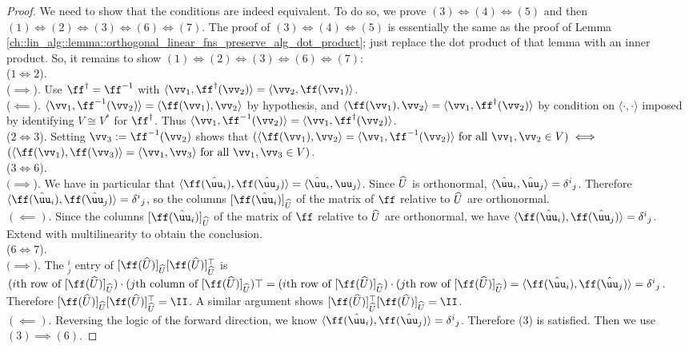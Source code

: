 \begin{proof}
    We need to show that the conditions are indeed equivalent. To do so, we prove $(3) \iff (4) \iff (5)$ and then $(1) \iff (2) \iff (3) \iff (6) \iff (7)$. The proof of $(3) \iff (4) \iff (5)$ is essentially the same as the proof of Lemma \ref{ch::lin_alg::lemma::orthogonal_linear_fns_preserve_alg_dot_product}; just replace the dot product of that lemma with an inner product. So, it remains to show $(1) \iff (2) \iff (3) \iff (6) \iff (7)$:
    \mbox{} \\
        ($1 \iff 2$).
        \\ \indent ($\implies$). Use $\ff^\dag = \ff^{-1}$ with $\langle \vv_1, \ff^\dag(\vv_2) \rangle = \langle \vv_2, \ff(\vv_1) \rangle$.
        \\ \indent($\impliedby$). $\langle \vv_1, \ff^{-1}(\vv_2) \rangle = \langle \ff(\vv_1), \vv_2 \rangle$ by hypothesis, and $\langle \ff(\vv_1), \vv_2 \rangle = \langle \vv_1, \ff^\dag(\vv_2) \rangle$ by condition on $\langle \cdot, \cdot \rangle$ imposed by identifying $V \cong V^*$ for $\ff^\dag$. Thus $\langle \vv_1, \ff^{-1}(\vv_2) \rangle = \langle \vv_1, \ff^\dag(\vv_2) \rangle$.
        \\ ($2 \iff 3$). Setting $\vv_3 := \ff^{-1}(\vv_2)$ shows that ${(\langle \ff(\vv_1), \vv_2 \rangle = \langle \vv_1, \ff^{-1}(\vv_2) \rangle \text{ for all $\vv_1, \vv_2 \in V$})} \iff$ \\ ${(\langle \ff(\vv_1), \ff(\vv_3) \rangle = \langle \vv_1, \vv_3 \rangle \text{ for all $\vv_1, \vv_3 \in V$})}$.
        \\ ($3 \iff 6$). 
        \\ \indent $(\implies$). We have in particular that $\langle \ff(\huu_i), \ff(\huu_j) \rangle = \langle \huu_i, {\uu}_j \rangle$. Since $\widehat{U}$ is orthonormal, $\langle \huu_i, \huu_j \rangle = \delta^i{}_j$. Therefore $\langle \ff(\huu_i), \ff(\huu_j) \rangle = \delta^i{}_j$, so the columns $[\ff(\huu_i)]_{\hU}$ of the matrix of $\ff$ relative to $\widehat{U}$ are orthonormal.
        \\ \indent $(\impliedby)$. Since the columns $[\ff(\huu_i)]_{\hU}$ of the matrix of $\ff$ relative to $\widehat{U}$ are orthonormal, we have $\langle \ff(\huu_i), \ff(\huu_j) \rangle = \delta^i{}_j$. Extend with multilinearity to obtain the conclusion.
        \\ ($6 \iff 7$).
        \\ \indent $(\implies$). The $^i_j$ entry of $[\ff(\hU)]_{\hU} [\ff(\hU)]_{\hU}^\top$ is $(\text{$i$th row of $[\ff(\hU)]_{\hU}$}) \cdot (\text{$j$th column of $[\ff(\hU)]_{\hU}$})\top = (\text{$i$th row of $[\ff(\hU)]_{\hU}$}) \cdot (\text{$j$th row of $[\ff(\hU)]_{\hU}$}) = \langle \ff(\huu_i), \ff(\huu_j) \rangle = \delta^i{}_j$. Therefore $[\ff(\hU)]_{\hU} [\ff(\hU)]_{\hU}^\top = \II$. A similar argument shows $[\ff(\hU)]_{\hU}^\top [\ff(\hU)]_{\hU} = \II$.
        \\ \indent $(\impliedby)$. Reversing the logic of the forward direction, we know $\langle \ff(\huu_i), \ff(\huu_j) \rangle = \delta^i{}_j$. Therefore (3) is satisfied. Then we use $(3) \implies (6)$.
\end{proof}

